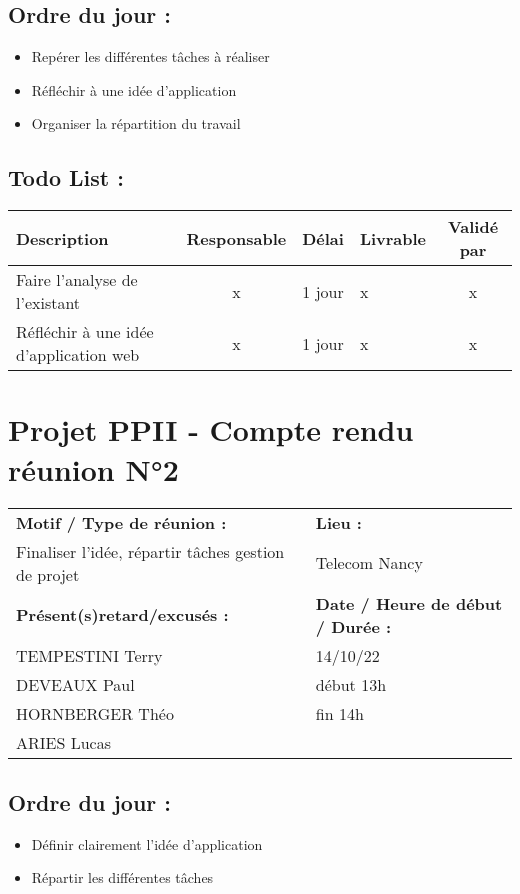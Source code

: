 \documentclass[12pt,titlepage]{report}
\begin{document}
\subsection*{Ordre du jour :}
\begin{itemize}
    \item{Repérer les différentes tâches à réaliser}
    \item{Réfléchir à une idée d’application}
    \item{Organiser la répartition du travail}
\end{itemize}

\subsection*{Todo List :}
\begin{tabular}{|p{3.5cm}|c|c|p{4.5cm}|c|}
    \hline 
    Description & Responsable & Délai & Livrable & Validé par 
    \\ \hline
    Faire l’analyse de l’existant & x & 1 jour & x & x
    \\ \hline
    Réfléchir à une idée d’application web & x & 1 jour & x & x
    \\ \hline
\end{tabular}
\newpage

\section*{Projet PPII - Compte rendu réunion N°2}
\begin{tabular}{|p{7cm}|p{6cm}|}
    \hline
    \textbf{Motif / Type de réunion :}
    & \textbf{Lieu :}
    \\
    Finaliser l’idée, répartir tâches gestion de projet 
    & 
    Telecom Nancy
    \\ \hline
    \textbf{Présent(s)retard/excusés :}
    &
    \textbf{Date / Heure de début / Durée :}
    \\ 
    TEMPESTINI Terry &  14/10/22\\  
    DEVEAUX Paul & début 13h\\
    HORNBERGER Théo & fin 14h\\
    ARIES Lucas & 
    \\ \hline
\end{tabular}

\subsection*{Ordre du jour :}
\begin{itemize}
    \item{Définir clairement l’idée d’application}
    \item{Répartir les différentes tâches}
\end{itemize}
\end{document}
